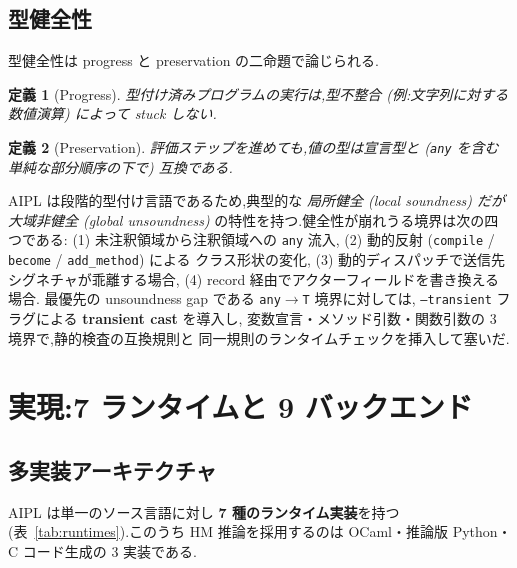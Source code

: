 \documentclass[11pt,a4paper]{article}
\newcommand{\code}[1]{\texttt{\small #1}}
\newtheorem{definition}{定義}
\begin{document}
\subsection{型健全性}\label{sec:sound}
型健全性は progress と preservation の二命題で論じられる.
\begin{definition}[Progress]
型付け済みプログラムの実行は,型不整合
(例:文字列に対する数値演算) によって stuck しない.
\end{definition}
\begin{definition}[Preservation]
評価ステップを進めても,値の型は宣言型と
(\code{any} を含む単純な部分順序の下で) 互換である.
\end{definition}

AIPL は段階的型付け言語であるため,典型的な
\emph{局所健全 (local soundness) だが大域非健全 (global unsoundness)}
の特性を持つ.健全性が崩れうる境界は次の四つである:
(1) 未注釈領域から注釈領域への \code{any} 流入,
(2) 動的反射 (\code{compile} / \code{become} / \code{add\_method}) による
クラス形状の変化,
(3) 動的ディスパッチで送信先シグネチャが乖離する場合,
(4) record 経由でアクターフィールドを書き換える場合.
最優先の unsoundness gap である \code{any}$\to$\code{T} 境界に対しては,
\code{--transient} フラグによる \textbf{transient cast} を導入し,
変数宣言・メソッド引数・関数引数の 3 境界で,静的検査の互換規則と
同一規則のランタイムチェックを挿入して塞いだ.

\section{実現:7 ランタイムと 9 バックエンド}\label{sec:impl}

\subsection{多実装アーキテクチャ}
AIPL は単一のソース言語に対し \textbf{7 種のランタイム実装}を持つ
(表~\ref{tab:runtimes}).このうち HM 推論を採用するのは
OCaml・推論版 Python・C コード生成の 3 実装である.
\end{document}
